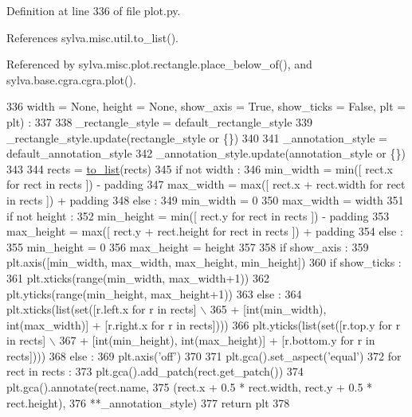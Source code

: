Definition at line 336 of file plot.\+py.



References sylva.\+misc.\+util.\+to\+\_\+list().



Referenced by sylva.\+misc.\+plot.\+rectangle.\+place\+\_\+below\+\_\+of(), and sylva.\+base.\+cgra.\+cgra.\+plot().


\begin{DoxyCode}
336     width = \textcolor{keywordtype}{None}, height = \textcolor{keywordtype}{None}, show\_axis = \textcolor{keyword}{True}, show\_ticks = \textcolor{keyword}{False}, plt = plt) :
337 
338     \_rectangle\_style = default\_rectangle\_style
339     \_rectangle\_style.update(rectangle\_style \textcolor{keywordflow}{or} \{\})
340 
341     \_annotation\_style = default\_annotation\_style
342     \_annotation\_style.update(annotation\_style \textcolor{keywordflow}{or} \{\})
343 
344     rects = \hyperlink{namespacesylva_1_1misc_1_1util_a03f5cfd365a10a5ec0567e320f987a9b}{to\_list}(rects)
345     \textcolor{keywordflow}{if} \textcolor{keywordflow}{not} width :
346       min\_width = min([ rect.x \textcolor{keywordflow}{for} rect \textcolor{keywordflow}{in} rects ]) - padding
347       max\_width = max([ rect.x + rect.width \textcolor{keywordflow}{for} rect \textcolor{keywordflow}{in} rects ]) + padding
348     \textcolor{keywordflow}{else} :
349       min\_width = 0
350       max\_width = width
351     \textcolor{keywordflow}{if} \textcolor{keywordflow}{not} height :
352       min\_height = min([ rect.y \textcolor{keywordflow}{for} rect \textcolor{keywordflow}{in} rects ]) - padding
353       max\_height = max([ rect.y + rect.height \textcolor{keywordflow}{for} rect \textcolor{keywordflow}{in} rects ]) + padding
354     \textcolor{keywordflow}{else} :
355       min\_height = 0
356       max\_height = height
357 
358     \textcolor{keywordflow}{if} show\_axis :
359       plt.axis([min\_width, max\_width, max\_height, min\_height])
360       \textcolor{keywordflow}{if} show\_ticks :
361         plt.xticks(range(min\_width, max\_width+1))
362         plt.yticks(range(min\_height, max\_height+1))
363       \textcolor{keywordflow}{else} :
364         plt.xticks(list(set([r.left.x \textcolor{keywordflow}{for} r \textcolor{keywordflow}{in} rects] \(\backslash\)
365           + [int(min\_width), int(max\_width)] + [r.right.x \textcolor{keywordflow}{for} r \textcolor{keywordflow}{in} rects])))
366         plt.yticks(list(set([r.top.y \textcolor{keywordflow}{for} r \textcolor{keywordflow}{in} rects] \(\backslash\)
367           + [int(min\_height), int(max\_height)] + [r.bottom.y \textcolor{keywordflow}{for} r \textcolor{keywordflow}{in} rects])))
368     \textcolor{keywordflow}{else} :
369       plt.axis(\textcolor{stringliteral}{'off'})
370 
371     plt.gca().set\_aspect(\textcolor{stringliteral}{'equal'})
372     \textcolor{keywordflow}{for} rect \textcolor{keywordflow}{in} rects :
373       plt.gca().add\_patch(rect.get\_patch())
374       plt.gca().annotate(rect.name,
375         (rect.x + 0.5 * rect.width, rect.y + 0.5 * rect.height),
376         **\_annotation\_style)
377     \textcolor{keywordflow}{return} plt
378 
\end{DoxyCode}
